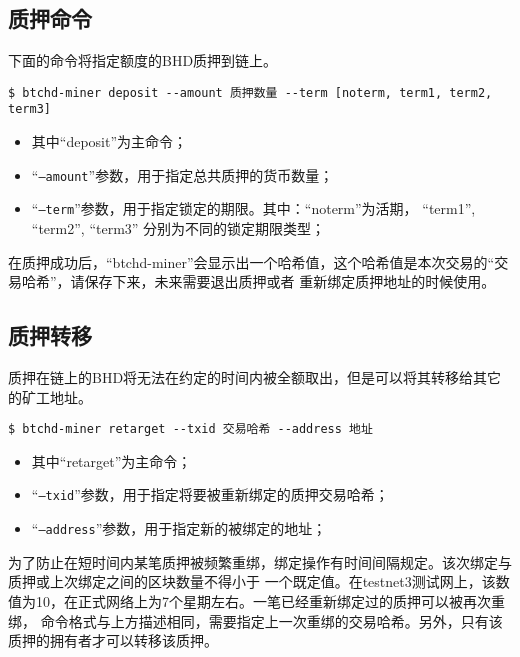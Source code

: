 \subsection{质押命令}
\begin{flushleft}
    下面的命令将指定额度的BHD质押到链上。
\end{flushleft}
\scriptsize
\begin{verbatim}
$ btchd-miner deposit --amount 质押数量 --term [noterm, term1, term2, term3]
\end{verbatim}
\normalsize
\begin{itemize}
    \item 其中``deposit''为主命令；
    \item ``\texttt{--amount}''参数，用于指定总共质押的货币数量；
    \item ``\texttt{--term}''参数，用于指定锁定的期限。其中：``noterm''为活期， ``term1'', ``term2'', ``term3''
        分别为不同的锁定期限类型；
\end{itemize}
\begin{flushleft}
    在质押成功后，``btchd-miner''会显示出一个哈希值，这个哈希值是本次交易的``交易哈希''，请保存下来，未来需要退出质押或者
    重新绑定质押地址的时候使用。
\end{flushleft}
\subsection{质押转移}
\begin{flushleft}
    质押在链上的BHD将无法在约定的时间内被全额取出，但是可以将其转移给其它的矿工地址。
\end{flushleft}
\scriptsize
\begin{verbatim}
$ btchd-miner retarget --txid 交易哈希 --address 地址
\end{verbatim}
\normalsize
\begin{itemize}
    \item 其中``retarget''为主命令；
    \item ``\texttt{--txid}''参数，用于指定将要被重新绑定的质押交易哈希；
    \item ``\texttt{--address}''参数，用于指定新的被绑定的地址；
\end{itemize}
\begin{flushleft}
    为了防止在短时间内某笔质押被频繁重绑，绑定操作有时间间隔规定。该次绑定与质押或上次绑定之间的区块数量不得小于
    一个既定值。在testnet3测试网上，该数值为10，在正式网络上为7个星期左右。一笔已经重新绑定过的质押可以被再次重绑，
    命令格式与上方描述相同，需要指定上一次重绑的交易哈希。另外，只有该质押的拥有者才可以转移该质押。
\end{flushleft}
